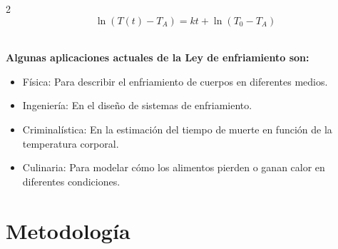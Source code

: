 \documentclass[11pt,letterpaper]{article}
\begin{document}
\begin{multicols}{2}
\begin{equation}
    \ln (T(t) - T_A) = kt + \ln (T_0 - T_A)
\end{equation}

\textbf{\\Algunas aplicaciones actuales de la Ley de enfriamiento son:}
\begin{itemize}
    \item Física: Para describir el enfriamiento de cuerpos en diferentes medios.
    \item Ingeniería: En el diseño de sistemas de enfriamiento.
    \item Criminalística: En la estimación del tiempo de muerte en función de la temperatura corporal.
    \item Culinaria: Para modelar cómo los alimentos pierden o ganan calor en diferentes condiciones.
\end{itemize}

  


\section{Metodología}

\end{multicols}
\end{document}

